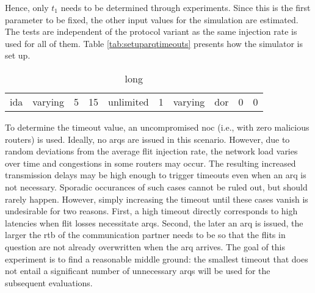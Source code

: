 Hence, only $t_1$ needs to be determined through experiments. Since this is the first parameter to be fixed, the other input values for the simulation
are estimated. The tests are independent of the protocol variant as the same injection rate is used for all of them. Table \vref{tab:setuparqtimeouts}
presents how the simulator is set up.

\begin{table}
    \centering
    \begin{tabulary}{\textwidth}{C|C|C|C|C|C|C|C|C|C}
        \pProtVar{} & \pNCMode{} & \pEncMods{} & \pAuthMods{} & \pRQSize{} & \pARQLimit{} & \pARQTimeout{} & \pRStrat{} & \pNumAttackers{} & \pAttackProb{} \\\hline
        \gls{ida}   & varying    & 5           & 15           & unlimited  & 1            & varying        & \gls{dor}  & 0                & 0 \\
    \end{tabulary}
    \caption[Input parameters for ARQ timeouts experiment]{long}
    \label{tab:setuparqtimeouts}
\end{table}

To determine the timeout value, an uncompromised \gls{noc} (i.e., with zero malicious routers) is used. Ideally, no \glspl{arq} are issued in this
scenario. However, due to random deviations from the average flit injection rate, the network load varies over time and congestions in some routers
may occur. The resulting increased transmission delays may be high enough to trigger timeouts even when an \gls{arq} is not necessary. Sporadic
occurances of such cases cannot be ruled out, but should rarely happen. However, simply increasing the timeout until these cases vanish is undesirable
for two reasons. First, a high timeout directly corresponds to high latencies when flit losses necessitate \glspl{arq}. Second, the later an \gls{arq}
is issued, the larger the \gls{rtb} of the communication partner needs to be so that the flits in question are not already overwritten when the
\gls{arq} arrives. The goal of this experiment is to find a reasonable middle ground: the smallest timeout that does not entail a significant number of
unnecessary \glspl{arq} will be used for the subsequent evaluations.

